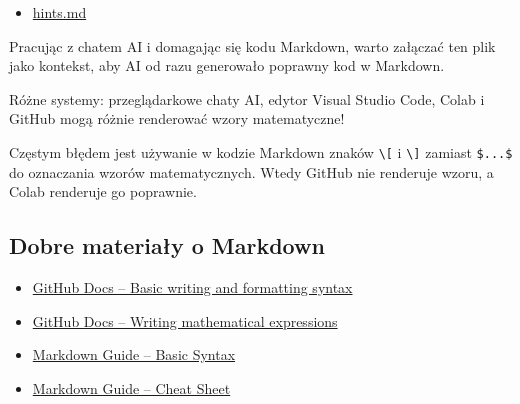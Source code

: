 \documentclass[12pt,a4paper]{article}
\begin{document}
\begin{itemize}
    \item \href{hints.md}{hints.md}
\end{itemize}

Pracując z chatem AI i domagając się kodu Markdown, warto załączać ten plik jako kontekst, aby AI od razu generowało poprawny kod w Markdown.

Różne systemy: przeglądarkowe chaty AI, edytor Visual Studio Code, Colab i GitHub mogą różnie renderować wzory matematyczne!

Częstym błędem jest używanie w kodzie Markdown znaków \texttt{\textbackslash[} i \texttt{\textbackslash]} zamiast \texttt{\$...\$} do oznaczania wzorów matematycznych. Wtedy GitHub nie renderuje wzoru, a Colab renderuje go poprawnie.

\subsection{Dobre materiały o Markdown}

\begin{itemize}
    \item \href{https://docs.github.com/en/get-started/writing-on-github/getting-started-with-writing-and-formatting-on-github/basic-writing-and-formatting-syntax}
    {GitHub Docs -- Basic writing and formatting syntax}

    \item \href{https://docs.github.com/en/get-started/writing-on-github/working-with-advanced-formatting/writing-mathematical-expressions}
    {GitHub Docs -- Writing mathematical expressions}

    \item \href{https://www.markdownguide.org/basic-syntax/}
    {Markdown Guide -- Basic Syntax}

    \item \href{https://www.markdownguide.org/cheat-sheet/}
    {Markdown Guide -- Cheat Sheet}
\end{itemize}
\end{document}
